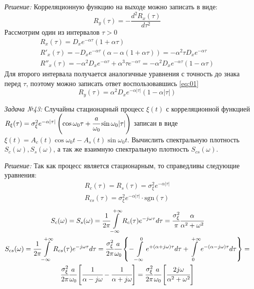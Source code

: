 \documentclass[14pt,final,titlepage,pscyr]{hedwork}
\begin{document}
\emph{Решение:} Корреляционную функцию на выходе можно записать в виде:
\begin{equation}
    R_y(\tau) = -\frac{d^2 R_x(\tau)}{d\tau^2}
    \label{eq:01}
\end{equation}
Рассмотрим один из интервалов \( \tau > 0 \)
\begin{gather}
    R_x(\tau) = D_x e^{-\alpha\tau}(1+\alpha\tau) \nonumber \\
    R'_x(\tau) = -D_x e^{-\alpha\tau}(\alpha-\alpha(1+\alpha\tau)) = 
    -\alpha^2\tau D_x e^{-\alpha\tau} \nonumber \\
    R''_x(\tau) = -\alpha^2 D_x e^{-\alpha\tau} + \alpha^3 \tau 
        e^{-\alpha\tau} = -\alpha^2 D_x e^{-\alpha\tau} ( 1 - \alpha\tau ) 
    \nonumber
\end{gather}
Для второго интервала получается аналогичные уравнения с точность до знака 
перед \( \tau \), поэтому можно записать ответ воспользовавшись \eqref{eq:01}
\[
    R_y(\tau) = \alpha^2 D_x e^{-\alpha|\tau|} ( 1 - \alpha|\tau| )
\]

\emph{Задача №43:} Случайны стационарный процесс \( \xi(t) \) с корреляционной 
функцией 
\( 
    R_\xi(\tau) = \sigma_\xi^2 e^{-\alpha|\tau|} \left( 
        \cos\omega_0\tau + \cfrac{a}{\omega_0}\sin\omega_0|\tau| 
    \right)
\) записан в виде \\ 
\( \xi(t) = A_c(t)\cos\omega_0 t - A_s(t)\sin\omega_0 t \). 
Вычислить спектральную плотность \( S_c(\omega), S_s(\omega) \), а так же 
взаимную спектральную плотность \( S_{cs}(\omega) \).

\emph{Решение:} Так как процесс является стационарным, то справедливы 
следующие уравнения:
\begin{gather}
    R_c(\tau) = R_s(\tau) = \sigma_\xi^2 e^{-\alpha|\tau|} \nonumber \\
    R_{cs}(\tau) = \sigma_\xi^2 e^{-\alpha|\tau|} \cdot \mathrm{sgn}(\tau)
\end{gather}
\begin{gather}
    S_c(\omega) = S_s(\omega) = \cfrac{1}{2\pi} \int\limits_{-\infty}^{+\infty}
        R_c(\tau) e^{-j\omega\tau} d\tau = \cfrac{\sigma_\xi^2}{\pi}
        \cfrac{\alpha}{\alpha^2 + \omega^2} \nonumber \\
    S_{cs}(\omega) = \cfrac{1}{2\pi} \int\limits_{-\infty}^{+\infty}
        R_{cs}(\tau) e^{-j\omega\tau} d\tau = \cfrac{\sigma_\xi^2}{2\pi}
        \cfrac{a}{\omega_0} \left\{ 
            -\int\limits_{-\infty}^{0} e^{+(\alpha+j\omega)\tau} d\tau
            +\int\limits_{0}^{+\infty} e^{-(\alpha-j\omega)\tau} d\tau
        \right\} = \nonumber \\
        \cfrac{\sigma_\xi^2}{2\pi}\cfrac{a}{\omega_0} \left[ 
            \cfrac{1}{\alpha-j\omega} - \cfrac{1}{\alpha+j\omega}
        \right] = \cfrac{\sigma_\xi^2}{2\pi}\cfrac{a}{\omega_0} \left[ 
            \cfrac{2j\omega}{\alpha^2 + \omega^2}
        \right] \nonumber
\end{gather}
\end{document}
